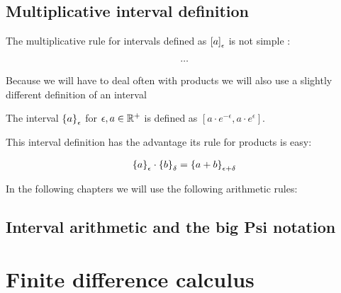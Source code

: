 \subsection{Multiplicative interval definition}

The multiplicative rule for intervals defined as $\an{a}$ is not simple :

\begin{align}
  \ldots
\end{align}

Because we will have to deal often with products we will also use a slightly different definition of an interval 

\begin{definition}
  The interval $\ean{a}$ for $\epsilon,a\in\Rplus$ is defined as $\left[a\cdot e^{-\epsilon},a\cdot e^\epsilon\right]$.
\end{definition}

\noindent This interval definition has the advantage its rule for products is easy: 

\begin{align}
  \ean[\epsilon]{a}\cdot \ean[\delta]{b} = \ean[\epsilon+\delta]{a+b}
\end{align}

In the following chapters we will use the following arithmetic rules:

\begin{theorem}

\end{theorem}

\subsection{Interval arithmetic and the big Psi notation}

\section{Finite difference calculus}

